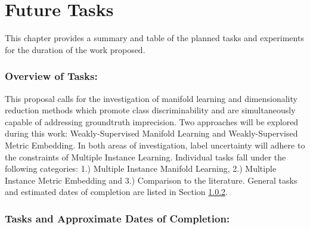 \chapter{Future Tasks}
This chapter provides a summary and table of the planned tasks and experiments for the duration of the work proposed.

\subsection{Overview of Tasks:}
This proposal calls for the investigation of manifold learning and dimensionality reduction methods which promote class discriminability and are simultaneously capable of addressing groundtruth imprecision.  Two approaches will be explored during this work: Weakly-Supervised  Manifold Learning and Weakly-Supervised  Metric Embedding. In both areas of investigation, label uncertainty will adhere to the constraints of Multiple Instance Learning.  Individual tasks fall under the following categories: 1.) Multiple Instance  Manifold  Learning, 2.) Multiple Instance Metric Embedding and 3.) Comparison to the literature.  General tasks and estimated dates of completion are listed in Section \ref{sec:task_table}.

\subsection{Tasks and Approximate Dates of Completion:} \label{sec:task_table}


